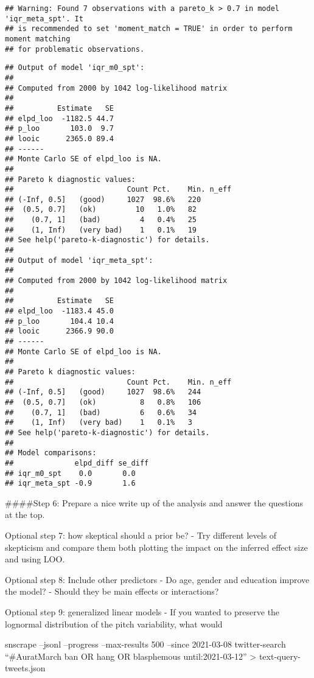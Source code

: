 \documentclass[
]{article}
\begin{document}
\begin{verbatim}
## Warning: Found 7 observations with a pareto_k > 0.7 in model 'iqr_meta_spt'. It
## is recommended to set 'moment_match = TRUE' in order to perform moment matching
## for problematic observations.
\end{verbatim}

\begin{verbatim}
## Output of model 'iqr_m0_spt':
## 
## Computed from 2000 by 1042 log-likelihood matrix
## 
##          Estimate   SE
## elpd_loo  -1182.5 44.7
## p_loo       103.0  9.7
## looic      2365.0 89.4
## ------
## Monte Carlo SE of elpd_loo is NA.
## 
## Pareto k diagnostic values:
##                          Count Pct.    Min. n_eff
## (-Inf, 0.5]   (good)     1027  98.6%   220       
##  (0.5, 0.7]   (ok)         10   1.0%   82        
##    (0.7, 1]   (bad)         4   0.4%   25        
##    (1, Inf)   (very bad)    1   0.1%   19        
## See help('pareto-k-diagnostic') for details.
## 
## Output of model 'iqr_meta_spt':
## 
## Computed from 2000 by 1042 log-likelihood matrix
## 
##          Estimate   SE
## elpd_loo  -1183.4 45.0
## p_loo       104.4 10.4
## looic      2366.9 90.0
## ------
## Monte Carlo SE of elpd_loo is NA.
## 
## Pareto k diagnostic values:
##                          Count Pct.    Min. n_eff
## (-Inf, 0.5]   (good)     1027  98.6%   244       
##  (0.5, 0.7]   (ok)          8   0.8%   106       
##    (0.7, 1]   (bad)         6   0.6%   34        
##    (1, Inf)   (very bad)    1   0.1%   3         
## See help('pareto-k-diagnostic') for details.
## 
## Model comparisons:
##              elpd_diff se_diff
## iqr_m0_spt    0.0       0.0   
## iqr_meta_spt -0.9       1.6
\end{verbatim}

\#\#\#\#Step 6: Prepare a nice write up of the analysis and answer the
questions at the top.

Optional step 7: how skeptical should a prior be? - Try different levels
of skepticism and compare them both plotting the impact on the inferred
effect size and using LOO.

Optional step 8: Include other predictors - Do age, gender and education
improve the model? - Should they be main effects or interactions?

Optional step 9: generalized linear models - If you wanted to preserve
the lognormal distribution of the pitch variability, what would

snscrape --jsonl --progress --max-results 500 --since 2021-03-08
twitter-search ``\#AuratMarch ban OR hang OR blasphemous
until:2021-03-12'' \textgreater{} text-query-tweets.json
\end{document}
